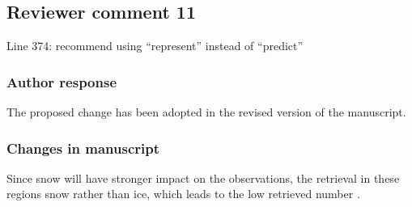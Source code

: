 %

\subsection*{Reviewer comment 11}
 Line 374: recommend using “represent” instead of “predict”

\subsubsection*{Author response}

The proposed change has been adopted in the revised version of the manuscript.

\subsubsection*{Changes in manuscript}

\begin{change}[374]
 Since snow will have \DIFdelbegin {}\DIFdelend \DIFaddbegin {}\DIFaddend stronger impact on the
observations, the retrieval in these regions \DIFdelbegin {}\DIFdelend \DIFaddbegin {}\DIFaddend snow
rather than ice, which leads to the low retrieved number \DIFdelbegin {}\DIFdelend \DIFaddbegin {}\DIFaddend .
\end{change}

